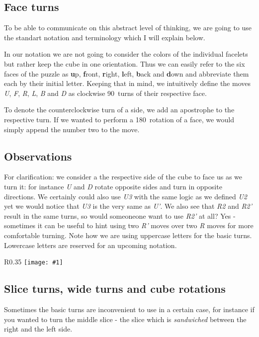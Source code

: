 \documentclass{scrreprt}
\newcommand{\wrapfig}[5] {
	\begin{wrapfigure}{#2}{#3\textwidth}
	\centering
	\texttt{[image: \#1]}
	\caption*{#5}
	\end{wrapfigure}
}
\begin{document}
\subsection{Face turns}
To be able to communicate on this abstract level of thinking, we are going to use the standart notation and terminology which I will explain below.\par
In our notation we are not going to consider the colors of the individual facelets but rather keep the cube in one orientation. Thus we can easily refer to the six faces of the puzzle as \textbf{u}p, \textbf{f}ront, \textbf{r}ight, \textbf{l}eft, \textbf{b}ack and \textbf{d}own and abbreviate them each by their initial letter. Keeping that in mind, we intuitively define the moves \emph{U}, \emph{F}, \emph{R}, \emph{L}, \emph{B} and \emph{D} as clockwise 90\textdegree\ turns of their respective face.\par
To denote the counterclockwise turn of a side, we add an apostrophe to the respective turn. If we wanted to perform a 180\textdegree\ rotation of a face, we would simply append the number two to the move.


\subsection{Observations}
For clarification: we consider a the respective side of the cube to face us as we turn it: for instance \emph{U} and \emph{D} rotate opposite sides and turn in opposite directions. We certainly could also use \emph{U3} with the same logic as we defined \emph{U2} yet we would notice that \emph{U3} is the very same as \emph{U'}. We also see that \emph{R2} and \emph{R2'} result in the same turns, so would someoneone want to use \emph{R2'} at all? Yes - sometimes it can be useful to hint using two \emph{R'} moves over two \emph{R} moves for more comfortable turning. Note how we are using uppercase letters for the basic turns. Lowercase letters are reserved for an upcoming notation.

\wrapfig{slices.png}{R}{0.35}{0.3}{From top to bottom: the middle, equatorial and standing slice}

\subsection{Slice turns, wide turns and cube rotations}
Sometimes the basic turns are inconvenient to use in a certain case, for instance if you wanted to turn the middle slice - the slice which is \emph{sandwiched} between the right and the left side.\par
\end{document}
